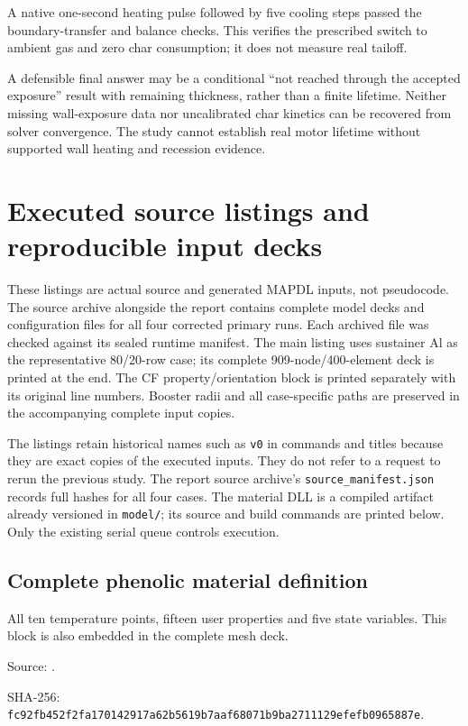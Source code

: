 \documentclass[oneside,openany]{amsdtx}
\begin{document}
A native one-second heating pulse followed by five cooling steps passed the boundary-transfer and balance checks. This verifies the prescribed switch to ambient gas and zero char consumption; it does not measure real tailoff.

A defensible final answer may be a conditional ``not reached through the accepted exposure'' result with remaining thickness, rather than a finite lifetime. Neither missing wall-exposure data nor uncalibrated char kinetics can be recovered from solver convergence. The study cannot establish real motor lifetime without supported wall heating and recession evidence.

\clearpage\appendix{}
\section{Executed source listings and reproducible input decks}
These listings are actual source and generated MAPDL inputs, not pseudocode. The source archive alongside the report contains complete model decks and configuration files for all four corrected primary runs. Each archived file was checked against its sealed runtime manifest. The main listing uses sustainer Al as the representative 80/20-row case; its complete 909-node/400-element deck is printed at the end. The CF property/orientation block is printed separately with its original line numbers. Booster radii and all case-specific paths are preserved in the accompanying complete input copies.

The listings retain historical names such as \texttt{v0} in commands and titles because they are exact copies of the executed inputs. They do not refer to a request to rerun the previous study. The report source archive's \texttt{source\_manifest.json} records full hashes for all four cases. The material DLL is a compiled artifact already versioned in \texttt{model/}; its source and build commands are printed below. Only the existing serial queue controls execution.

\clearpage\subsection{Complete phenolic material definition}
All ten temperature points, fifteen user properties and five state variables. This block is also embedded in the complete mesh deck.

{\footnotesize\noindent Source: .\par\noindent SHA-256: \texttt{fc92fb452f2fa170142917a62b5619b7aaf68071b9ba2711129efefb0965887e}.\par}

\end{document}
